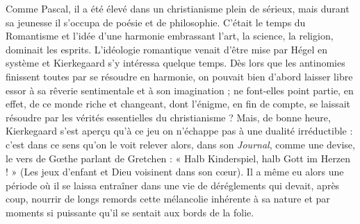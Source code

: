 \documentclass[12pt,a4paper]{article}
\newcommand{\opage}[1]{\marginnote{\footnotesize\textit{[#1]}}}
\begin{document}
\opage{227} Comme Pascal, il a été élevé dans un christianisme plein de
sérieux, mais durant sa jeunesse il s'occupa de poésie et de philosophie.
C'était le temps du Romantisme et l'idée d'une harmonie
embrassant l'art, la science, la religion, dominait les esprits.
L'idéologie romantique venait d'être mise par Hégel en système et
Kierkegaard s'y intéressa quelque temps. Dès lors que les antinomies
finissent toutes par se résoudre en harmonie, on pouvait
bien d'abord laisser libre essor à sa rêverie sentimentale et à son
imagination ; ne font-elles point partie, en effet, de ce monde riche
et changeant, dont l'énigme, en fin de compte, se laissait résoudre
par les vérités essentielles du christianisme ? Mais, de bonne heure,
Kierkegaard s'est aperçu qu'à ce jeu on n'échappe pas à une dualité
irréductible : c'est dans ce sens qu'on le voit relever alors, dans
son \emph{Journal}, comme une devise, le vers de Gœthe parlant de
Gretchen : « Halb Kinderspiel, halb Gott im Herzen ! » (Les jeux
d'enfant et Dieu voisinent dans son cœur). Il a même eu alors une
période où il se laissa entraîner dans une vie de déréglements qui
devait, après coup, nourrir de longs remords cette mélancolie
inhérente à sa nature et par moments si puissante qu'il se sentait
aux bords de la folie.
\end{document}
